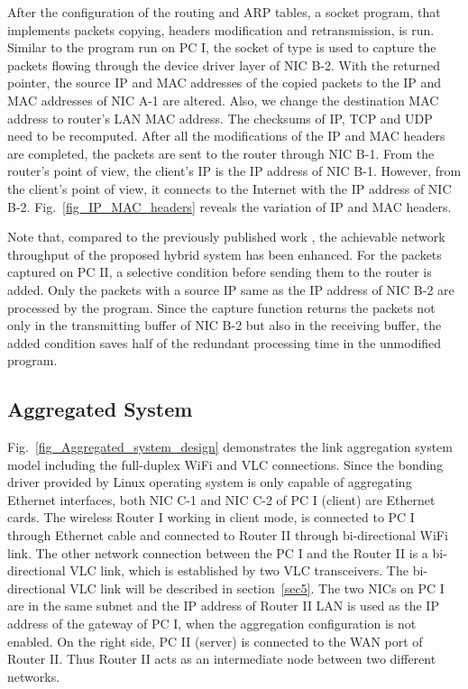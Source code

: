 \documentclass[10pt,journal]{IEEEtran}
\begin{document}
After the configuration of the routing and ARP tables, a socket program, that implements packets copying, headers modification and retransmission, is run. Similar to the program run on PC I, the socket of type  is used to capture the packets flowing through the device driver layer of NIC B-2. With the returned pointer, the source IP and MAC addresses of the copied packets to the IP and MAC addresses of NIC A-1 are altered. Also, we change the destination MAC address to router's LAN MAC address. The checksums of IP, TCP and UDP need to be recomputed. After all the modifications of the IP and MAC headers are completed, the packets are sent to the router through NIC B-1. From the router's point of view, the client's IP is the IP address of NIC B-1. However, from the client's point of view, it connects to the Internet with the IP address of NIC B-2. Fig.~\ref{fig_IP_MAC_headers} reveals the variation of IP and MAC headers.

Note that, compared to the previously published work \cite{shaoindoor}, the achievable network throughput of the proposed hybrid system has been enhanced. For the packets captured on PC II, a selective condition before sending them to the router is added. Only the packets with a source IP same as the IP address of NIC B-2 are processed by the program. Since the capture function returns the packets not only in the transmitting buffer of NIC B-2 but also in the receiving buffer, the added condition saves half of the redundant processing time in the unmodified program.

\subsection{Aggregated System}
Fig.~\ref{fig_Aggregated_system_design} demonstrates the link aggregation system model including the full-duplex WiFi and VLC connections. Since the bonding driver provided by Linux operating system is only capable of aggregating Ethernet interfaces, both NIC C-1 and NIC C-2 of PC I (client) are Ethernet cards. The wireless Router I working in client mode, is connected to PC I through Ethernet cable and connected to Router II through bi-directional WiFi link. The other network connection between the PC I and the Router II is a bi-directional VLC link, which is established by two VLC transceivers. The bi-directional VLC link will be described in section~\ref{sec5}. The two NICs on PC I are in the same subnet and the IP address of Router II LAN is used as the IP address of the gateway of PC I, when the aggregation configuration is not enabled. On the right side, PC II (server) is connected to the WAN port of Router II. Thus Router II acts as an intermediate node between two different networks.
\end{document}
